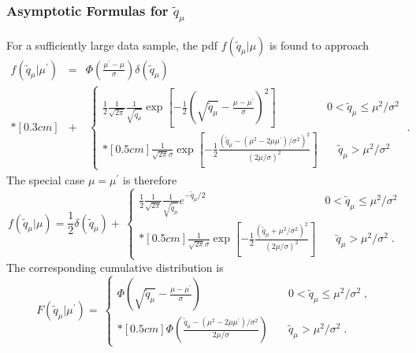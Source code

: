 \subsubsection{Asymptotic Formulas for $\tilde q_{\mu}$}
\label{sec:tildeqmu} 

For a sufficiently large data sample,  the pdf $f(\tilde{q}_{\mu} | \mu)$ is found to approach
\begin{eqnarray}
\label{eqn:ftildeqmmp} 
f(\tilde{q}_{\mu}|\mu^{\prime}) & = & 
\Phi \left( \frac{\mu^{\prime} - \mu}{\sigma} \right) 
\delta (\tilde{q}_{\mu}) \nonumber \\*[0.3 cm] 
& + &
 \: \left\{ \! \! \begin{array}{lll}
\frac{1}{2} \frac{1}{\sqrt{2 \pi}} \frac{1}{\sqrt{\tilde{q}_{\mu}}}
\exp \left[ -\frac{1}{2} \left( \sqrt{\tilde{q}_{\mu}} -
\frac{\mu - \mu^{\prime}}{\sigma} \right)^2 \right]
                 & 0 < \tilde{q}_{\mu} \le \mu^2/\sigma^{2}  \\*[0.5 cm]
\frac{1}{\sqrt{2 \pi} \sigma} \exp \left[
-\frac{1}{2} \frac{ (\tilde{q}_{\mu} - 
(\mu^2 - 2 \mu \mu^{\prime})/\sigma^{2} )^2 }
{(2 \mu/\sigma)^2} \right] 
                 &  \quad \tilde{q}_{\mu} > \mu^2/\sigma^{2} 
              \end{array}
       \right.
\;.
\end{eqnarray}
The special case $\mu = \mu^{\prime}$ is therefore
\begin{equation}
\label{eqn:ftildeqmm} 
f(\tilde{q}_{\mu}|\mu) = 
\frac{1}{2} \delta (\tilde{q}_{\mu}) +
 \: \left\{ \! \! \begin{array}{lll}
\frac{1}{2} \frac{1}{\sqrt{2 \pi}} \frac{1}{\sqrt{\tilde{q}_{\mu}}}
e^{- \tilde{q}_{\mu}/2}
                 & 0 < \tilde{q}_{\mu} \le \mu^2/\sigma^2  \\*[0.5 cm]
\frac{1}{\sqrt{2 \pi} \sigma} \exp \left[
-\frac{1}{2} \frac{ (\tilde{q}_{\mu} + \mu^2/\sigma^2 )^2 }
{(2 \mu/\sigma)^2} \right] 
                 &  \quad \tilde{q}_{\mu} > \mu^2/\sigma^2 \;.
              \end{array}
       \right.
\end{equation}
The corresponding cumulative distribution is
\begin{equation}
\label{eqn:tildeqmmpcdf} 
F(\tilde{q}_{\mu}|\mu^{\prime}) = 
 \: \left\{ \! \! \begin{array}{lll}
\Phi\left( \sqrt{\tilde{q}_{\mu}} - 
\frac{\mu - \mu^{\prime}}{\sigma} \right)
                 & \quad 0 < \tilde{q}_{\mu} \le \mu^2/\sigma^{2}  
\;, \\*[0.5 cm]
\Phi \left( \frac{ \tilde{q}_{\mu} - 
(\mu^2 - 2 \mu \mu^{\prime})/\sigma^{2}}
{2\mu/\sigma} \right)
                 &  \quad \tilde{q}_{\mu} > \mu^2/\sigma^{2} \;.
              \end{array}
       \right.
\end{equation}


